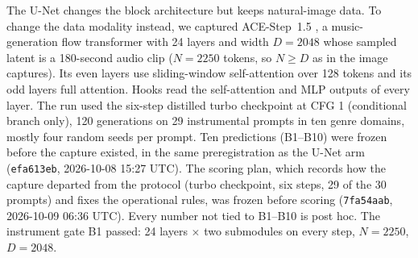 \documentclass[11pt]{article}
\begin{document}
The U-Net changes the block architecture but keeps natural-image data. To change the data modality instead, we captured ACE-Step~1.5 \citep{gong2026acestep15}, a music-generation flow transformer with 24 layers and width $D=2048$ whose sampled latent is a 180-second audio clip ($N=2250$ tokens, so $N\ge D$ as in the image captures). Its even layers use sliding-window self-attention over 128 tokens and its odd layers full attention. Hooks read the self-attention and MLP outputs of every layer. The run used the six-step distilled turbo checkpoint at CFG 1 (conditional branch only), 120 generations on 29 instrumental prompts in ten genre domains, mostly four random seeds per prompt. Ten predictions (B1--B10) were frozen before the capture existed, in the same preregistration as the U-Net arm (\texttt{efa613eb}, 2026-10-08 15:27 UTC). The scoring plan, which records how the capture departed from the protocol (turbo checkpoint, six steps, 29 of the 30 prompts) and fixes the operational rules, was frozen before scoring (\texttt{7fa54aab}, 2026-10-09 06:36 UTC). Every number not tied to B1--B10 is post hoc. The instrument gate B1 passed: 24 layers $\times$ two submodules on every step, $N=2250$, $D=2048$.
\end{document}
